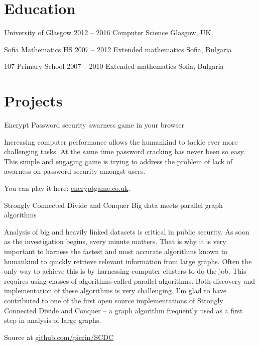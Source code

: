 \documentclass{tccv}
\begin{document}
\section{\LARGE Education \normalsize}

\begin{yearlist}

\item[University of Glasgow]
     {2012 -- 2016}
     {Computer Science}
     {Glasgow, UK}

\item[Sofia Mathematics HS]
     {2007 -- 2012}
     {Extended mathematics}
     {Sofia, Bulgaria}

\item[107 Primary School]
     {2007 -- 2010}
     {Extended mathematics}
     {Sofia, Bulgaria}
\end{yearlist}

\section{\LARGE Projects \normalsize}

\begin{eventlist}

\item{Encrypt}
     {Password security awarness game in your browser}
     {Increasing computer performance allows the humankind to tackle ever more challenging tasks. At the same time password cracking has never been so easy. This simple and engaging game is trying to address the problem of lack of awarness on password security amongst users. \par\medskip You can play it here: \href{encryptgame.co.uk}{encryptgame.co.uk}.
     }

\item{Strongly Connected Divide and Conquer}
   {Big data meets parallel graph algorithms}
   {Analysis of big and heavily linked datasets is critical in public security. As soon as the investigation begins, every minute matters. That is why it is very important to harness the fastest and most accurate algorithms known to humankind to quickly retrieve relevant information from large graphs. Often the only way to achieve this is by harnessing computer clusters to do the job. This requires using classes of algorithms called parallel algorithms. Both discovery and implementation of these algorithms is very challenging. I'm glad to have contributed to one of the first open source implementations of Strongly Connected Divide and Conquer -- a graph algorithm frequently used as a first step in analysis of large graphs. \par\medskip
   Source at 
   \href{http://github.com/picrin/SCDC}{github.com/picrin/SCDC}
   }

\end{eventlist}
\end{document}
